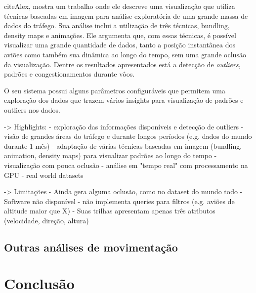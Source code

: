   cite{Alex}, mostra um trabalho onde ele descreve uma visualização que utiliza
  técnicas baseadas em imagem para análise exploratória de uma grande massa
  de dados do tráfego. Sua análise inclui a utilização de três técnicas, bundling,
  density maps e animações. Ele argumenta que, com essas técnicas, é possível visualizar
  uma grande quantidade de dados, tanto a posição instantânea dos aviões como também
  sua dinâmica ao longo do tempo, sem uma grande oclusão da visualização. 
  Dentre os resultados apresentados está a detecção de \textit{outliers}, padrões
  e congestionamentos durante vôos.

  
  O seu sistema possui alguns parâmetros configuráveis que permitem uma exploração dos dados que
  trazem vários insights para visualização de padrões e outliers nos dados.

-> Highlights:
  - exploração das informações disponíveis e detecção de outliers
  - visão de grandes áreas do tráfego e durante longos períodos (e.g. dados do mundo durante 1 mês)
  - adaptação de várias técnicas baseadas em imagem (bundling, animation, density maps) para visualizar
  padrões ao longo do tempo
  - visualização com pouca oclusão
  - análise em "tempo real" com processamento na GPU
  - real world datasets

-> Limitações
  - Ainda gera alguma oclusão, como no dataset do mundo todo
  - Software não disponível
  - não implementa queries para filtros (e.g. aviões de altitude maior que X)
  - Suas trilhas apresentam apenas três atributos (velocidade, direção, altura)

\subsection{Outras análises de movimentação}

\section{Conclusão}

